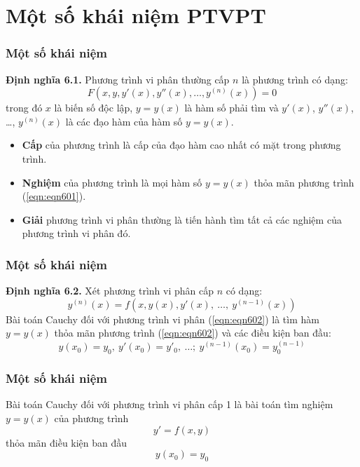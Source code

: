\section{Một số khái niệm PTVPT}

\begin{frame}
	\frametitle{Một số khái niệm}
	\textbf{Định nghĩa 6.1.} Phương trình vi phân thường cấp $n$ là phương trình có dạng:
	\begin{equation}\label{eqn:eqn601}
		F\left(x,y,y'(x), y''(x),\ldots, y^{(n)}(x) \right) = 0
	\end{equation}
	trong đó $x$ là biến số độc lập, $y=y(x)$ là hàm số phải tìm và $y'(x)$, $y''(x)$, \ldots, $y^{(n)}(x)$ là các đạo hàm của hàm số $y=y(x)$.
	\begin{itemize}
		\item \textbf{Cấp} của phương trình là cấp của đạo hàm cao nhất có mặt trong phương trình.
		\item \textbf{Nghiệm} của phương trình là mọi hàm số $y=y(x)$ thỏa mãn phương trình (\ref{eqn:eqn601}).
		\item \textbf{Giải} phương trình vi phân thường là tiến hành tìm tất cả các nghiệm của phương trình vi phân đó.
	\end{itemize}
\end{frame}

\begin{frame}
	\frametitle{Một số khái niệm}
	\textbf{Định nghĩa 6.2.} Xét phương trình vi phân cấp $n$ có dạng:
	\begin{equation}\label{eqn:eqn602}
		y^{(n)}(x)=f\left(x,y(x),y'(x),~\ldots,~y^{(n-1)}(x)\right)
	\end{equation}
	Bài toán Cauchy đối với phương trình vi phân (\ref{eqn:eqn602}) là tìm hàm $y=y(x)$ thỏa mãn phương trình (\ref{eqn:eqn602}) và các điều kiện ban đầu:
	$$y(x_0)=y_0,~y'(x_0)=y'_0,~\ldots;~y^{(n-1)}(x_0)=y^{(n-1)}_0$$
\end{frame}

\begin{frame}
	\frametitle{Một số khái niệm}
	Bài toán Cauchy đối với phương trình vi phân cấp 1 là bài toán tìm nghiệm $y=y(x)$ của phương trình\\
	\begin{equation}\label{eqn:eqn603}
		y'=f(x,y)
	\end{equation}
	thỏa mãn điều kiện ban đầu
	\begin{equation}\label{eqn:eqn604}
		y(x_0)=y_0
	\end{equation}
\end{frame}

